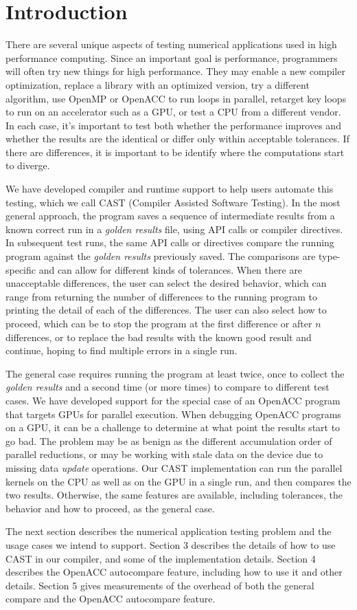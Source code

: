 \section{Introduction}

There are several unique aspects of testing numerical applications used in high performance computing.
Since an important goal is performance, programmers will often try new things for high performance.
They may enable a new compiler optimization, replace a library with an optimized version, try a different algorithm, use OpenMP or OpenACC to run loops in parallel, retarget key loops to run on an accelerator such as a GPU, or test a CPU from a different vendor.
In each case, it's important to test both whether the performance improves and whether the results are the identical or differ only within acceptable tolerances.
If there are differences, it is important to be identify where the computations start to diverge.

We have developed compiler and runtime support to help users automate this testing, which we call CAST (Compiler Assisted Software Testing).
In the most general approach, the program saves a sequence of intermediate results from a known correct run in a \emph{golden results} file, using API calls or compiler directives.
In subsequent test runs, the same API calls or directives compare the running program against the \emph{golden results} previously saved.
The comparisons are type-specific and can allow for different kinds of tolerances.
When there are unacceptable differences, the user can select the desired behavior, which can range from returning the number of differences to the running program to printing the detail of each of the differences.
The user can also select how to proceed, which can be to stop the program at the first difference or after $n$ differences, or to replace the bad results with the known good result and continue, hoping to find multiple errors in a single run.

The general case requires running the program at least twice, once to collect the \emph{golden results} and a second time (or more times) to compare to different test cases.
We have developed support for the special case of an OpenACC program that targets GPUs for parallel execution.
When debugging OpenACC programs on a GPU, it can be a challenge to determine at what point the results start to go bad.
The problem may be as benign as the different accumulation order of parallel reductions, or may be working with stale data on the device due to missing data \emph{update} operations.
Our CAST implementation can run the parallel kernels on the CPU as well as on the GPU in a single run, and then compares the two results.
Otherwise, the same features are available, including tolerances, the behavior and how to proceed, as the general case.

The next section describes the numerical application testing problem and the usage cases we intend to support.
Section 3 describes the details of how to use CAST in our compiler, and some of the implementation details.
Section 4 describes the OpenACC autocompare feature, including how to use it and other details.
Section 5 gives measurements of the overhead of both the general compare and the OpenACC autocompare feature.

